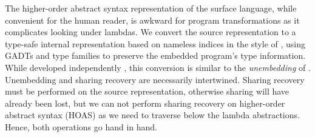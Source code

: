 The higher-order abstract syntax
representation of the surface language, while convenient for the human reader,
is awkward for program transformations as it complicates looking under lambdas.
We convert the source representation to a type-safe internal representation
based on nameless  indices in the style of
\citet{Altenkirch:2003kz}, using GADTs \cite{Jones:2006eh} and type families
\cite{Chakravarty:2005dx,Schrijvers:2008ir} to preserve the embedded program's
type information. While developed independently
\cite{McDonell:2013wi,Chakravarty:2009uo}, this conversion is similar to the
\emph{unembedding} of \citet{Atkey:2009dj}. Unembedding and sharing recovery are
necessarily intertwined. Sharing recovery must be performed on the source
representation, otherwise sharing will have already been lost, but we can not
perform sharing recovery on higher-order abstract syntax (HOAS) as we need to traverse below the lambda abstractions.
Hence, both operations go hand in hand.

